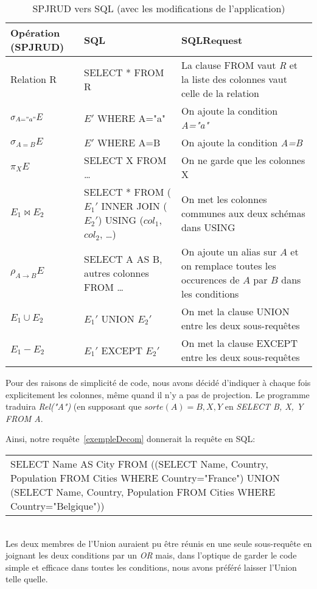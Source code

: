 \documentclass[]{article}
\begin{document}
\begin{table}[H]
	\centering
	\begin{tabular}{| l | p{100px} | p{100px} |}
		\hline
		Op\'eration (SPJRUD) & SQL & SQLRequest\\
		\hline
		Relation R & SELECT * FROM R & La clause FROM vaut \textit{R} et la liste des colonnes vaut celle de la relation\\
		\hline
		$\sigma_{A="a"} E$ & $E'$ WHERE A="a" & On ajoute la condition \textit{A="a"}\\
		\hline
		$\sigma_{A=B} E$ & $E'$ WHERE A=B & On ajoute la condition \textit{A=B}\\
		\hline
		$\pi_X E$ & SELECT X FROM \ldots & On ne garde que les colonnes X\\
		\hline
		$E_1 \bowtie E_2$ & SELECT * FROM ($E_1'$ INNER JOIN ($E_2'$) USING ($col_1$, $col_2$, \ldots) & On met les colonnes communes aux deux sch\'emas dans USING \\
		\hline
		$\rho_{A \to B} E$ & SELECT A AS B, autres colonnes FROM \ldots & On ajoute un alias sur $A$ et on remplace toutes les occurences de $A$ par $B$ dans les conditions\\
		\hline
		$E_1 \cup E_2$ & $E_1'$ UNION $E_2'$ & On met la clause UNION entre les deux sous-requ\^etes\\
		\hline
		$E_1 - E_2$ & $E_1'$ EXCEPT $E_2'$ & On met la clause EXCEPT entre les deux sous-requ\^etes\\
		\hline
	\end{tabular}
	\caption{SPJRUD vers SQL (avec les modifications de l'application)}
\end{table}

Pour des raisons de simplicit\'e de code, nous avons d\'ecid\'e d'indiquer \`a chaque fois explicitement les colonnes, m\^eme quand il n'y a pas de projection. Le programme traduira \textit{Rel("A")} (en supposant que $sorte(A)={B, X, Y}$ en \textit{SELECT B, X, Y FROM A}.

Ainsi, notre requ\^ete~\ref{exempleDecom} donnerait la requ\^ete en SQL:\\

\begin{tabular}{p{275px}}
	SELECT Name AS City FROM ((SELECT Name, Country, Population FROM Cities WHERE Country="France") UNION (SELECT Name, Country, Population FROM Cities WHERE Country="Belgique"))
\end{tabular}
\\

Les deux membres de l'Union auraient pu \^etre r\'eunis en une seule sous-requ\^ete en joignant les deux conditions par un \textit{OR} mais, dans l'optique de garder le code simple et efficace dans toutes les conditions, nous avons pr\'ef\'er\'e laisser l'Union telle quelle.
\end{document}

